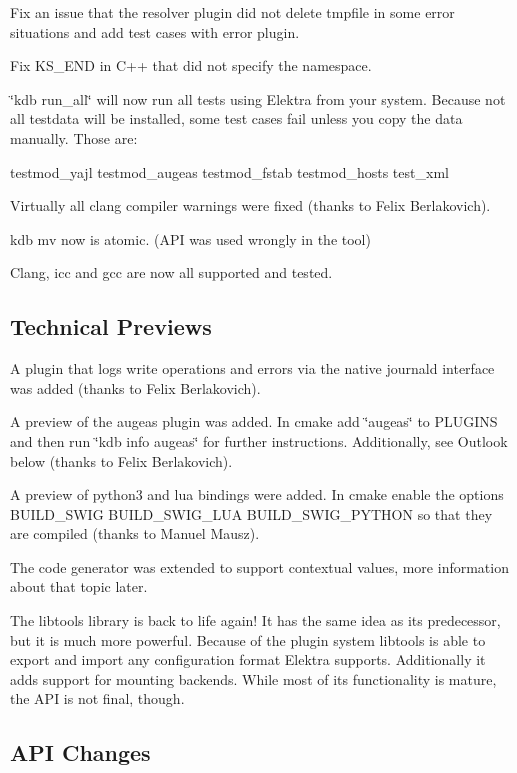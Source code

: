 Fix an issue that the resolver plugin did not delete tmpfile in some error situations and add test cases with error plugin.

Fix K\+S\+\_\+\+E\+ND in C++ that did not specify the namespace.

\char`\"{}kdb run\+\_\+all\char`\"{} will now run all tests using Elektra from your system. Because not all testdata will be installed, some test cases fail unless you copy the data manually. Those are\+: \begin{DoxyVerb}testmod_yajl testmod_augeas testmod_fstab testmod_hosts test_xml
\end{DoxyVerb}


Virtually all clang compiler warnings were fixed (thanks to Felix Berlakovich).

kdb mv now is atomic. (A\+PI was used wrongly in the tool)

Clang, icc and gcc are now all supported and tested.

\subsection*{Technical Previews}

A plugin that logs write operations and errors via the native journald interface was added (thanks to Felix Berlakovich).

A preview of the augeas plugin was added. In cmake add \char`\"{}augeas\char`\"{} to P\+L\+U\+G\+I\+NS and then run \char`\"{}kdb info augeas\char`\"{} for further instructions. Additionally, see Outlook below (thanks to Felix Berlakovich).

A preview of python3 and lua bindings were added. In cmake enable the options {\ttfamily B\+U\+I\+L\+D\+\_\+\+S\+W\+IG B\+U\+I\+L\+D\+\_\+\+S\+W\+I\+G\+\_\+\+L\+UA B\+U\+I\+L\+D\+\_\+\+S\+W\+I\+G\+\_\+\+P\+Y\+T\+H\+ON} so that they are compiled (thanks to Manuel Mausz).

The code generator was extended to support contextual values, more information about that topic later.

The libtools library is back to life again! It has the same idea as its predecessor, but it is much more powerful. Because of the plugin system libtools is able to export and import any configuration format Elektra supports. Additionally it adds support for mounting backends. While most of its functionality is mature, the A\+PI is not final, though.

\subsection*{A\+PI Changes}

